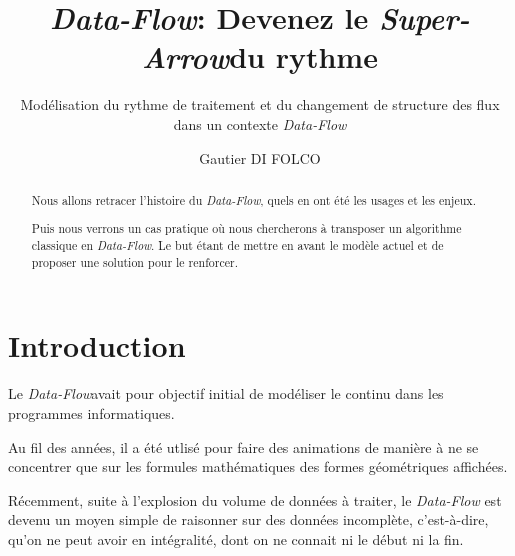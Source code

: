 \documentclass{llncs}
\newcommand{\DF}{\emph{Data-Flow}}
\newcommand{\SA}{\emph{Super-Arrow}}
\begin{document}
\title{\DF : Devenez le \SA du rythme}


\subtitle{Modélisation du rythme de traitement et du changement de structure des flux dans un contexte \DF}


\author{Gautier DI FOLCO}







\maketitle

\begin{abstract}
Nous allons retracer l'histoire du \DF, quels en ont été les usages et les enjeux.

Puis nous verrons un cas pratique où nous chercherons à transposer un algorithme
classique en \DF.
Le but étant de mettre en avant le modèle actuel et de proposer une solution pour
le renforcer.
\end{abstract}

\section{Introduction}
Le \DF avait pour objectif initial de modéliser le continu dans les
programmes informatiques.

Au fil des années, il a été utlisé pour faire des animations de manière à ne se
concentrer que sur les formules mathématiques des formes géométriques affichées.

Récemment, suite à l'explosion du volume de données à traiter, le \DF
est devenu un moyen simple de raisonner sur des données incomplète, c'est-à-dire,
qu'on ne peut avoir en intégralité, dont on ne connait ni le début ni la fin.
\end{document}
